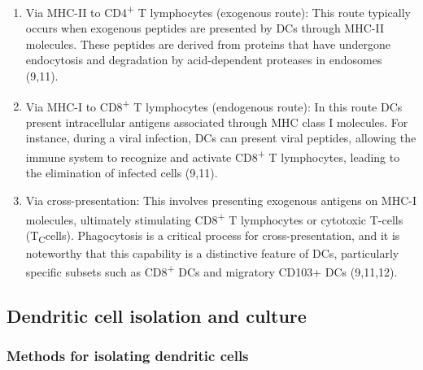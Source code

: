 \documentclass[
]{article}
\begin{document}
\begin{enumerate}
\def\labelenumi{\arabic{enumi}.}
\item
  Via MHC-II to CD4\textsuperscript{+} T lymphocytes (exogenous route):
  This route typically occurs when exogenous peptides are presented by
  DCs through MHC-II molecules. These peptides are derived from proteins
  that have undergone endocytosis and degradation by acid-dependent
  proteases in endosomes (9,11).
\item
  Via MHC-I to CD8\textsuperscript{+} T lymphocytes (endogenous route):
  In this route DCs present intracellular antigens associated through
  MHC class I molecules. For instance, during a viral infection, DCs can
  present viral peptides, allowing the immune system to recognize and
  activate CD8\textsuperscript{+} T lymphocytes, leading to the
  elimination of infected cells (9,11).
\item
  Via cross-presentation: This involves presenting exogenous antigens on
  MHC-I molecules, ultimately stimulating CD8\textsuperscript{+} T
  lymphocytes or cytotoxic T-cells (T\textsubscript{C}cells).
  Phagocytosis is a critical process for cross-presentation, and it is
  noteworthy that this capability is a distinctive feature of DCs,
  particularly specific subsets such as CD8\textsuperscript{+} DCs and
  migratory CD103+ DCs (9,11,12).
\end{enumerate}

\subsection{Dendritic cell isolation and
culture}\label{dendritic-cell-isolation-and-culture}

\subsubsection{Methods for isolating dendritic
cells}\label{methods-for-isolating-dendritic-cells}
\end{document}
